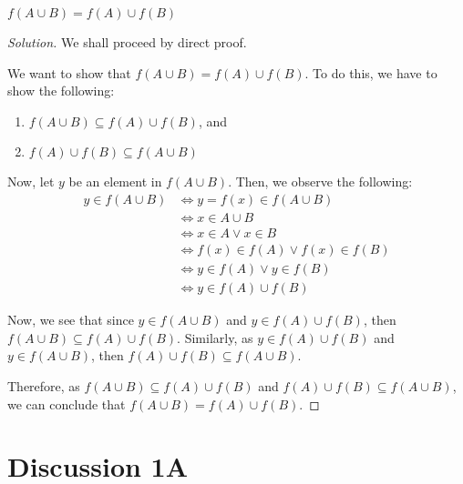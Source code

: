 \documentclass[openany]{book}
\newenvironment{solution}{\begin{proof}[Solution]}{\end{proof}}
\begin{document}
\begin{hw}
	$f(A \cup B) = f(A) \cup f(B)$
\end{hw}
\begin{solution}
	We shall proceed by direct proof.
	
	We want to show that $f(A \cup B) = f(A) \cup f(B)$. To do this, we have to show the following:
	\begin{enumerate}
		\item $f(A \cup B) \subseteq f(A) \cup f(B)$, and
		\item $f(A) \cup f(B) \subseteq f(A \cup B)$
	\end{enumerate}
	
	Now, let $y$ be an element in $f(A \cup B)$. Then, we observe the following:
	\begin{align*}
		y \in f(A \cup B) &\iff y=f(x) \in f(A \cup B) \tag{by definition} \\
		&\iff x \in A \cup B \\
		&\iff x \in A \lor x \in B \\
		&\iff f(x) \in f(A) \lor f(x) \in f(B) \\
		&\iff y \in f(A) \lor y \in f(B) \tag{by definition} \\
		&\iff y \in f(A) \cup f(B)
	\end{align*}
	
	Now, we see that since $y \in f(A \cup B)$ and $y \in f(A) \cup f(B)$, then $f(A \cup B) \subseteq f(A) \cup f(B)$. Similarly, as $y \in f(A) \cup f(B)$ and $y \in f(A \cup B)$, then $f(A) \cup f(B) \subseteq f(A \cup B)$.
	
	Therefore, as $f(A \cup B) \subseteq f(A) \cup f(B)$ and $f(A) \cup f(B) \subseteq f(A \cup B)$, we can conclude that $f(A \cup B) = f(A) \cup f(B)$.
\end{solution}

\newpage

\chapter{Discussion 1A}
\end{document}
